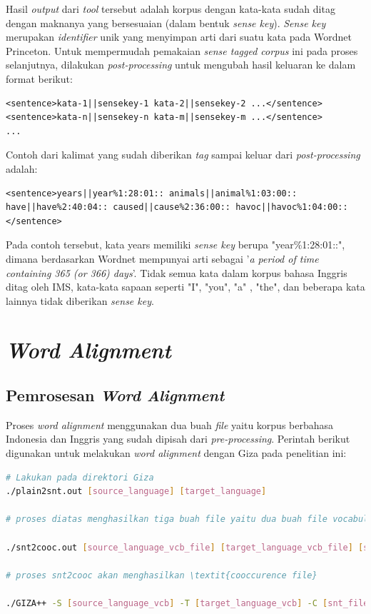 Hasil \textit{output} dari \textit{tool} tersebut adalah korpus dengan kata-kata sudah ditag dengan maknanya yang bersesuaian (dalam bentuk \textit{sense key}). \textit{Sense key} merupakan \textit{identifier} unik yang menyimpan arti dari suatu kata pada Wordnet Princeton. Untuk mempermudah pemakaian \textit{sense tagged corpus} ini pada proses selanjutnya, dilakukan \textit{post-processing} untuk mengubah hasil keluaran ke dalam format berikut:

\begin{lstlisting}
<sentence>kata-1||sensekey-1 kata-2||sensekey-2 ...</sentence>
<sentence>kata-n||sensekey-n kata-m||sensekey-m ...</sentence>
...
\end{lstlisting}

Contoh dari kalimat yang sudah diberikan \textit{tag} sampai keluar dari \textit{post-processing} adalah:

\begin{lstlisting}
<sentence>years||year%1:28:01:: animals||animal%1:03:00:: have||have%2:40:04:: caused||cause%2:36:00:: havoc||havoc%1:04:00::</sentence>
\end{lstlisting}

Pada contoh tersebut, kata years memiliki \textit{sense key} berupa "year\%1:28:01::", dimana berdasarkan Wordnet mempunyai arti sebagai '\textit{a period of time containing 365 (or 366) days}'. Tidak semua kata dalam korpus bahasa Inggris ditag oleh IMS, kata-kata sapaan seperti "I", "you", "a" , "the", dan beberapa kata lainnya tidak diberikan \textit{sense key}.  



\section{\textit{Word Alignment}}

\subsection{Pemrosesan \textit{Word Alignment}}
Proses \textit{word alignment} menggunakan dua buah \textit{file} yaitu korpus berbahasa Indonesia dan Inggris yang sudah dipisah dari \textit{pre-processing}. Perintah berikut digunakan untuk melakukan \textit{word alignment} dengan Giza pada penelitian ini:

\begin{lstlisting}[language=bash,caption={Word Alignment}, label={word-alignment}]
# Lakukan pada direktori Giza
./plain2snt.out [source_language] [target_language]

# proses diatas menghasilkan tiga buah file yaitu dua buah file vocabulary yang berisi indeks dengan kata (bahasa asal, dan bahasa tujuan), dan satu buah file snt yang berisi \textit{alignment} dari kalimat.

./snt2cooc.out [source_language_vcb_file] [target_language_vcb_file] [snt_file] > [coocurrence_file]

# proses snt2cooc akan menghasilkan \textit{cooccurence file}

./GIZA++ -S [source_language_vcb] -T [target_language_vcb] -C [snt_file] -CoocurrenceFile [cooc_file]
\end{lstlisting}

